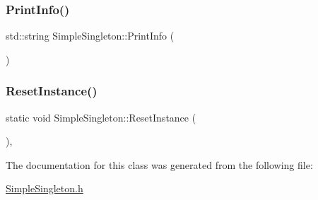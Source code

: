 \mbox{\label{class_simple_singleton_a31826b918981462cc7d2ef0b7261082a}} 
\subsubsection{\texorpdfstring{PrintInfo()}{PrintInfo()}}
{\footnotesize\ttfamily std\+::string Simple\+Singleton\+::\+Print\+Info (\begin{DoxyParamCaption}{ }\end{DoxyParamCaption})\hspace{0.3cm}{\ttfamily [inline]}}

\mbox{\label{class_simple_singleton_a81614f1e12c738b592cb7ec6339dbeed}} 
\subsubsection{\texorpdfstring{ResetInstance()}{ResetInstance()}}
{\footnotesize\ttfamily static void Simple\+Singleton\+::\+Reset\+Instance (\begin{DoxyParamCaption}{ }\end{DoxyParamCaption})\hspace{0.3cm}{\ttfamily [inline]}, {\ttfamily [static]}}



The documentation for this class was generated from the following file\+:\begin{DoxyCompactItemize}
\item 
\mbox{\hyperlink{_simple_singleton_8h}{Simple\+Singleton.\+h}}\end{DoxyCompactItemize}

